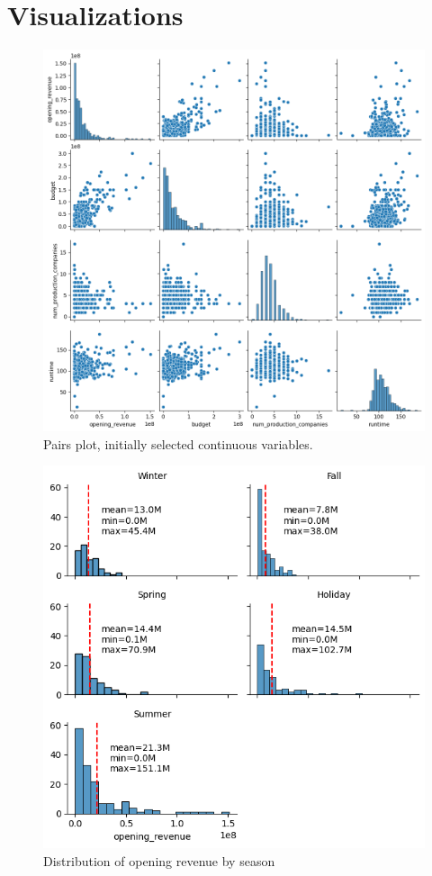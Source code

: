 \documentclass[10pt]{article}
\begin{document}
\section{Visualizations}
\begin{figure}[H]
	\begin{center}
		\centerline{\includegraphics[width=\columnwidth]{pairs_plot}}
		\caption{Pairs plot, initially selected continuous variables.}
	\end{center}
\end{figure}

\begin{figure}[H]
	\begin{center}
		\centerline{\includegraphics[scale=0.5]{season_revenue}}
		\caption{Distribution of opening revenue by season}
	\end{center}
\end{figure}
\end{document}
